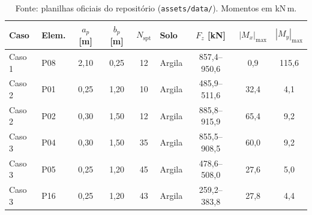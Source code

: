\begin{table}[!t]
    \centering
    \caption{Casos de estudo congelados: geometria dos pilares, sondagem e envelope dos esforços característicos nas três combinações de carregamento.}
    \label{tab:casos}
    \small
    \begin{tabular}{llccclccc}
        \toprule
        Caso & Elem. & $a_p$ [m] & $b_p$ [m] & $N_{\mathrm{spt}}$ & Solo & $F_z$ [kN] & $|M_x|_{\max}$ & $|M_y|_{\max}$ \\
        \midrule
        Caso 1 & P08 & 2,10 & 0,25 & 12 & Argila & 857,4--950,6 & 0,9 & 115,6 \\
        Caso 2 & P01 & 0,25 & 1,20 & 10 & Argila & 485,9--511,6 & 32,4 & 4,1 \\
        Caso 2 & P02 & 0,30 & 1,50 & 12 & Argila & 885,8--915,9 & 65,4 & 9,2 \\
        Caso 3 & P04 & 0,30 & 1,50 & 35 & Argila & 855,5--908,5 & 60,0 & 9,2 \\
        Caso 3 & P05 & 0,25 & 1,20 & 45 & Argila & 478,6--508,0 & 27,6 & 5,0 \\
        Caso 3 & P16 & 0,25 & 1,20 & 43 & Argila & 259,2--383,8 & 27,8 & 4,4 \\
        \bottomrule
    \end{tabular}
    \caption*{\footnotesize Fonte: planilhas oficiais do repositório (\texttt{assets/data/}). Momentos em kN\,m.}
\end{table}
